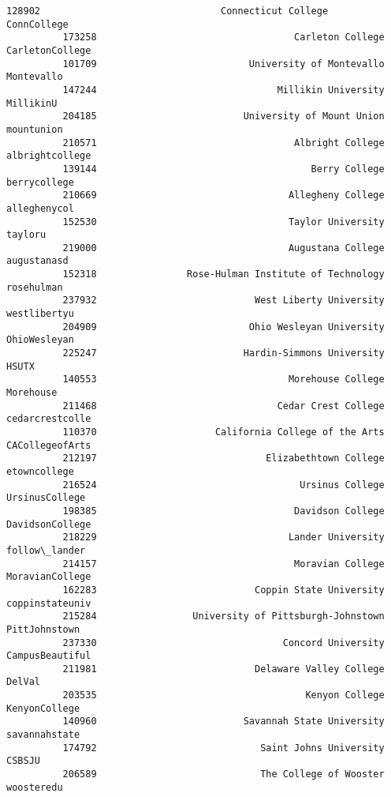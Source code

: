\documentclass[11pt]{article}
\begin{document}
\begin{Verbatim}[commandchars=\\\{\}]
          128902                                Connecticut College      ConnCollege   
          173258                                   Carleton College  CarletonCollege   
          101709                           University of Montevallo       Montevallo   
          147244                                Millikin University        MillikinU   
          204185                          University of Mount Union       mountunion   
          210571                                   Albright College  albrightcollege   
          139144                                      Berry College     berrycollege   
          210669                                  Allegheny College     alleghenycol   
          152530                                  Taylor University          tayloru   
          219000                                  Augustana College      augustanasd   
          152318                Rose-Hulman Institute of Technology       rosehulman   
          237932                            West Liberty University     westlibertyu   
          204909                           Ohio Wesleyan University     OhioWesleyan   
          225247                          Hardin-Simmons University            HSUTX   
          140553                                  Morehouse College        Morehouse   
          211468                                Cedar Crest College  cedarcrestcolle   
          110370                     California College of the Arts  CACollegeofArts   
          212197                              Elizabethtown College     etowncollege   
          216524                                    Ursinus College   UrsinusCollege   
          198385                                   Davidson College  DavidsonCollege   
          218229                                  Lander University    follow\_lander   
          214157                                   Moravian College  MoravianCollege   
          162283                            Coppin State University  coppinstateuniv   
          215284                 University of Pittsburgh-Johnstown    PittJohnstown   
          237330                                 Concord University  CampusBeautiful   
          211981                            Delaware Valley College           DelVal   
          203535                                     Kenyon College    KenyonCollege   
          140960                          Savannah State University    savannahstate   
          174792                             Saint Johns University           CSBSJU   
          206589                             The College of Wooster       woosteredu   

\end{Verbatim}
\end{document}
